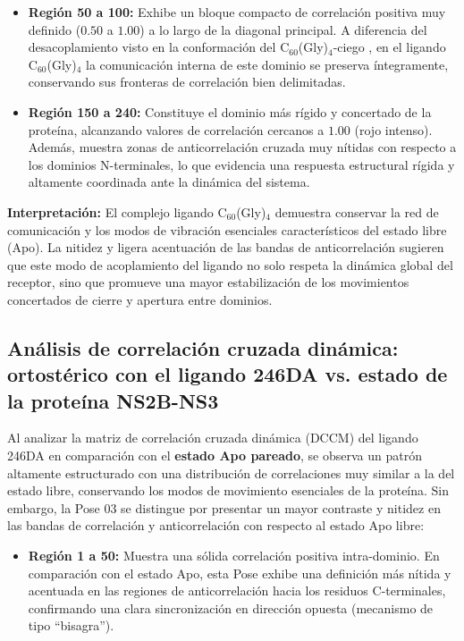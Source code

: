 \begin{table}[htbp]
\begin{itemize}
    \item \textbf{Región 50 a 100:} Exhibe un bloque compacto de correlación positiva muy definido ($0.50$ a $1.00$) a lo largo de la diagonal principal. A diferencia del desacoplamiento visto en la conformación del C$_{60}$(Gly)$_{4}$-ciego , en el ligando C$_{60}$(Gly)$_{4}$ la comunicación interna de este dominio se preserva íntegramente, conservando sus fronteras de correlación bien delimitadas.
    
    \item \textbf{Región 150 a 240:} Constituye el dominio más rígido y concertado de la proteína, alcanzando valores de correlación cercanos a $1.00$ (rojo intenso). Además, muestra zonas de anticorrelación cruzada muy nítidas con respecto a los dominios N-terminales, lo que evidencia una respuesta estructural rígida y altamente coordinada ante la dinámica del sistema.
\end{itemize}

\textbf{Interpretación:} El complejo ligando C$_{60}$(Gly)$_{4}$ demuestra conservar la red de comunicación y los modos de vibración esenciales característicos del estado libre (Apo). La nitidez y ligera acentuación de las bandas de anticorrelación sugieren que este modo de acoplamiento del ligando no solo respeta la dinámica global del receptor, sino que promueve una mayor estabilización de los movimientos concertados de cierre y apertura entre dominios.

\subsection*{Análisis de correlación cruzada dinámica: ortostérico con el ligando 246DA  vs. estado de la proteína NS2B-NS3}

Al analizar la matriz de correlación cruzada dinámica (DCCM) del ligando 246DA en comparación con el \textbf{estado Apo pareado}, se observa un patrón altamente estructurado con una distribución de correlaciones muy similar a la del estado libre, conservando los modos de movimiento esenciales de la proteína. Sin embargo, la Pose 03 se distingue por presentar un mayor contraste y nitidez en las bandas de correlación y anticorrelación con respecto al estado Apo libre:

\begin{itemize}
    \item \textbf{Región 1 a 50:} Muestra una sólida correlación positiva intra-dominio. En comparación con el estado Apo, esta Pose exhibe una definición más nítida y acentuada en las regiones de anticorrelación  hacia los residuos C-terminales, confirmando una clara sincronización en dirección opuesta (mecanismo de tipo ``bisagra'').
    

\end{itemize}
\end{table}
